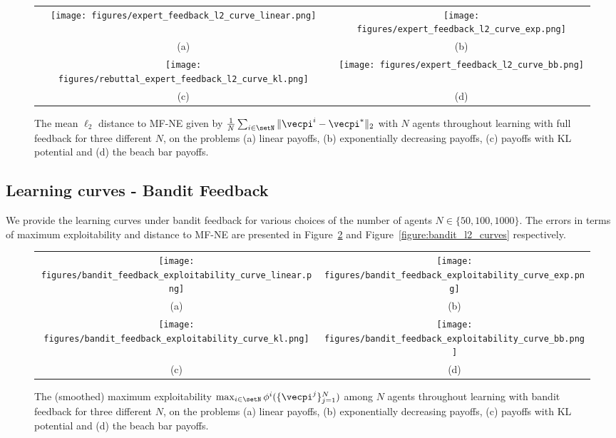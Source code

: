 \begin{figure}[h]
\centering
\begin{tabular}{cc}
  \texttt{[image: figures/expert\_feedback\_l2\_curve\_linear.png]} &   \texttt{[image: figures/expert\_feedback\_l2\_curve\_exp.png]} \\
(a) & (b) \\
\texttt{[image: figures/rebuttal\_expert\_feedback\_l2\_curve\_kl.png]} &   \texttt{[image: figures/expert\_feedback\_l2\_curve\_bb.png]} \\
(c) & (d)
\end{tabular}
\caption{
The mean $\ell_2$ distance to MF-NE given by $\frac{1}{N}\sum_{i\in\setN} \| \vecpi^i - \vecpi^*\|_2$ with $N$ agents throughout learning with full feedback for three different $N$, on the problems (a) linear payoffs, (b) exponentially decreasing payoffs, (c) payoffs with KL potential and (d) the beach bar payoffs.
}
\label{figure:expert_l2_curves}
\end{figure}



\subsection{Learning curves - Bandit Feedback}

We provide the learning curves under bandit feedback for various choices of the number of agents $N \in \{ 50, 100, 1000 \}$.
The errors in terms of maximum exploitability and distance to MF-NE are presented in Figure~\ref{figure:bandit_exp_curves} and Figure~\ref{figure:bandit_l2_curves} respectively.

\begin{figure}[h]
\centering
\begin{tabular}{cc}
  \texttt{[image: figures/bandit\_feedback\_exploitability\_curve\_linear.png]} &   \texttt{[image: figures/bandit\_feedback\_exploitability\_curve\_exp.png]} \\
(a) & (b) \\
\texttt{[image: figures/bandit\_feedback\_exploitability\_curve\_kl.png]} &   \texttt{[image: figures/bandit\_feedback\_exploitability\_curve\_bb.png]} \\
(c) & (d)
\end{tabular}
\caption{
The (smoothed) maximum exploitability $\max_{i\in\setN} \phi^i(\{\vecpi^j\}_{j=1}^N)$ among $N$ agents throughout learning with bandit feedback for three different $N$, on the problems (a) linear payoffs, (b) exponentially decreasing payoffs, (c) payoffs with KL potential and (d) the beach bar payoffs.
}
\label{figure:bandit_exp_curves}
\end{figure}

